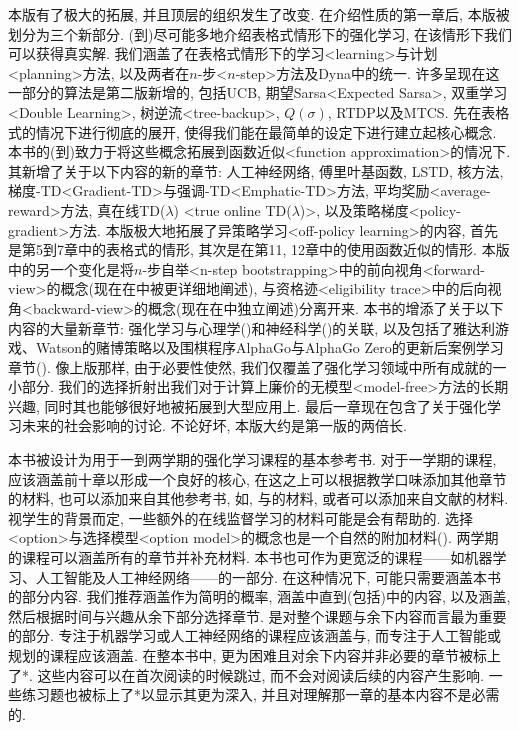 本版有了极大的拓展, 并且顶层的组织发生了改变. 在介绍性质的第一章后, 本版被划分为三个新部分. (到)尽可能多地介绍表格式情形下的强化学习, 在该情形下我们可以获得真实解. 我们涵盖了在表格式情形下的学习<learning>与计划<planning>方法, 以及两者在$n$-步<$n$-step>方法及Dyna中的统一. 许多呈现在这一部分的算法是第二版新增的, 包括UCB, 期望Sarsa<Expected Sarsa>, 双重学习<Double Learning>, 树逆流<tree-backup>, $Q(\sigma)$, RTDP以及MTCS. 先在表格式的情况下进行彻底的展开, 使得我们能在最简单的设定下进行建立起核心概念. 本书的(到)致力于将这些概念拓展到函数近似<function approximation>的情况下. 其新增了关于以下内容的新的章节: 人工神经网络, 傅里叶基函数, LSTD, 核方法, 梯度-TD<Gradient-TD>与强调-TD<Emphatic-TD>方法, 平均奖励<average-reward>方法, 真在线TD($\lambda$) <true online TD($\lambda$)>, 以及策略梯度<policy-gradient>方法. 本版极大地拓展了异策略学习<off-policy learning>的内容, 首先是第5到7章中的表格式的情形, 其次是在第11, 12章中的使用函数近似的情形. 本版中的另一个变化是将$n$-步自举<n-step bootstrapping>中的前向视角<forward-view>的概念(现在在中被更详细地阐述), 与资格迹<eligibility trace>中的后向视角<backward-view>的概念(现在在中独立阐述)分离开来. 本书的增添了关于以下内容的大量新章节: 强化学习与心理学()和神经科学()的关联, 以及包括了雅达利游戏、Watson的赌博策略以及围棋程序AlphaGo与AlphaGo Zero的更新后案例学习章节(). 像上版那样, 由于必要性使然, 我们仅覆盖了强化学习领域中所有成就的一小部分. 我们的选择折射出我们对于计算上廉价的无模型<model-free>方法的长期兴趣, 同时其也能够很好地被拓展到大型应用上. 最后一章现在包含了关于强化学习未来的社会影响的讨论. 不论好坏, 本版大约是第一版的两倍长.

本书被设计为用于一到两学期的强化学习课程的基本参考书. 对于一学期的课程, 应该涵盖前十章以形成一个良好的核心, 在这之上可以根据教学口味添加其他章节的材料, 也可以添加来自其他参考书, 如\citet{Bertsekas1996}, \citet{Wiering2012a}与\citet{Szepesvari2010}的材料, 或者可以添加来自文献的材料. 视学生的背景而定, 一些额外的在线监督学习的材料可能是会有帮助的. 选择<option>与选择模型<option model>的概念也是一个自然的附加材料(\citet{Sutton1999}). 两学期的课程可以涵盖所有的章节并补充材料. 本书也可作为更宽泛的课程——如机器学习、人工智能及人工神经网络——的一部分. 在这种情况下, 可能只需要涵盖本书的部分内容. 我们推荐涵盖作为简明的概率, 涵盖中直到(包括)中的内容, 以及涵盖, 然后根据时间与兴趣从余下部分选择章节. 是对整个课题与余下内容而言最为重要的部分. 专注于机器学习或人工神经网络的课程应该涵盖与, 而专注于人工智能或规划的课程应该涵盖. 在整本书中, 更为困难且对余下内容并非必要的章节被标上了*. 这些内容可以在首次阅读的时候跳过, 而不会对阅读后续的内容产生影响. 一些练习题也被标上了*以显示其更为深入, 并且对理解那一章的基本内容不是必需的. 

